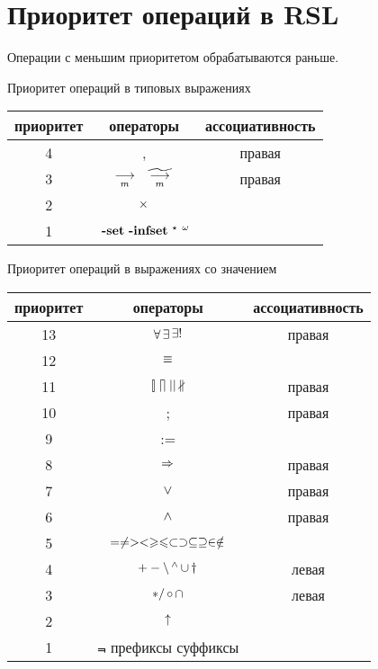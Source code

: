 \section{Приоритет операций в RSL}\label{sec:priority}

Операции с меньшим приоритетом обрабатываются раньше.

Приоритет операций в типовых выражениях
\begin{center}
\begin{tabular}{|c|c|c|}
\hline приоритет & операторы & ассоциативность\\
\hline  4 & , & правая\\
\hline  3 & $~\mathop{\longrightarrow}\limits_{m}~ ~\widetilde{~\mathop{\longrightarrow}\limits_{m}~}~$ & правая\\
\hline  2 & $\mathop{\times}$ & \\
\hline  1 & ${\ }\Set {\ }\Infset {\ }\List {\ }\Inflist$ & \\
\hline
\end{tabular}
\end{center}

Приоритет операций в выражениях со значением
\begin{center}
\begin{tabular}{|c|c|c|}
\hline приоритет & операторы & ассоциативность\\
\hline 13 & $\mathop{\forall} \mathop{\exists} \mathop{\exists!}$ & правая \\
\hline 12 & $\mathop{\equiv}$ & \\
\hline 11 & $\mathop{[\!]} \mathop{\lceil\!\rceil} || \mathop{\nparallel}$ & правая \\
\hline 10 & ; & правая \\
\hline 9 & := & \\
\hline 8 & $\mathop{\Rightarrow}$ & правая \\
\hline 7 & $\vee$ & правая \\
\hline 6 & $\wedge$ & правая \\
\hline 5 & $= \neq > < \geqslant\leqslant \subset \supset \subseteq \supseteq
\in \notin$ &  \\
\hline 4 & $+ - \mathop{\setminus} \mathop{{ }^\wedge} \mathop{\cup} \mathop{\dag}$ & левая \\
\hline 3 & $* / \mathop{\circ} \mathop{\cap}$ & левая \\
\hline 2 & $\uparrow$ & \\
\hline 1 & $\Not$ префиксы суффиксы& \\
\hline
\end{tabular}
\end{center}
